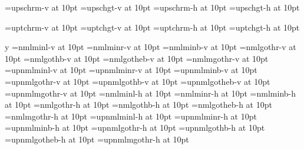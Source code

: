 \ifx\MAPSETsc\undefined\else\ifx\ucs\undefined\else
  \shipout\vbox{\DIR\ADJUST
    \iftdir
      \tfont\x=upschrm-v at 10pt\x\TESTSC
      \tfont\x=upschgt-v at 10pt\x\TESTSC
    \else
      \jfont\x=upschrm-h at 10pt\x\TESTSC
      \jfont\x=upschgt-h at 10pt\x\TESTSC
    \fi
  }\fi
\fi

\ifx\MAPSETtc\undefined\else\ifx\ucs\undefined\else
  \shipout\vbox{\DIR\ADJUST
    \iftdir
      \tfont\x=uptchrm-v at 10pt\x\TESTTC
      \tfont\x=uptchgt-v at 10pt\x\TESTTC
    \else
      \jfont\x=uptchrm-h at 10pt\x\TESTTC
      \jfont\x=uptchgt-h at 10pt\x\TESTTC
    \fi
  }\fi
\fi

\if y\USEOTF
\ifx\MAPSETja\undefined\else\shipout\vbox{\DIR\ADJUST
  \iftdir
    \ifx\ucs\undefined
      \tfont\x=nmlminl-v at 10pt\x\TESTJP
      \tfont\x=nmlminr-v at 10pt\x\TESTJP
      \tfont\x=nmlminb-v at 10pt\x\TESTJP
      \tfont\x=nmlgothr-v at 10pt\x\TESTJP
      \tfont\x=nmlgothb-v at 10pt\x\TESTJP
      \tfont\x=nmlgotheb-v at 10pt\x\TESTJP
      \tfont\x=nmlmgothr-v at 10pt\x\TESTJP
    \else
      \tfont\x=upnmlminl-v at 10pt\x\TESTJP
      \tfont\x=upnmlminr-v at 10pt\x\TESTJP
      \tfont\x=upnmlminb-v at 10pt\x\TESTJP
      \tfont\x=upnmlgothr-v at 10pt\x\TESTJP
      \tfont\x=upnmlgothb-v at 10pt\x\TESTJP
      \tfont\x=upnmlgotheb-v at 10pt\x\TESTJP
      \tfont\x=upnmlmgothr-v at 10pt\x\TESTJP
    \fi
  \else
    \ifx\ucs\undefined
      \tfont\x=nmlminl-h at 10pt\x\TESTJP
      \tfont\x=nmlminr-h at 10pt\x\TESTJP
      \tfont\x=nmlminb-h at 10pt\x\TESTJP
      \tfont\x=nmlgothr-h at 10pt\x\TESTJP
      \tfont\x=nmlgothb-h at 10pt\x\TESTJP
      \tfont\x=nmlgotheb-h at 10pt\x\TESTJP
      \tfont\x=nmlmgothr-h at 10pt\x\TESTJP
    \else
      \tfont\x=upnmlminl-h at 10pt\x\TESTJP
      \tfont\x=upnmlminr-h at 10pt\x\TESTJP
      \tfont\x=upnmlminb-h at 10pt\x\TESTJP
      \tfont\x=upnmlgothr-h at 10pt\x\TESTJP
      \tfont\x=upnmlgothb-h at 10pt\x\TESTJP
      \tfont\x=upnmlgotheb-h at 10pt\x\TESTJP
      \tfont\x=upnmlmgothr-h at 10pt\x\TESTJP
    \fi
  \fi
}\fi
\fi

